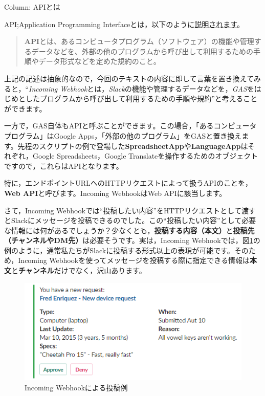 \documentclass[uplatex,a4j]{jsarticle}
\begin{document}
\begin{itembox}[l]{Column: APIとは}

API;Application Programming Interfaceとは，以下のように\href{http://e-words.jp/w/API.html}{説明されます}。

\begin{quote}
\textbf{API}とは、あるコンピュータプログラム（ソフトウェア）の機能や管理するデータなどを、外部の他のプログラムから呼び出して利用するための手順やデータ形式などを定めた規約のこと。
\end{quote}

上記の記述は抽象的なので，今回のテキストの内容に即して言葉を置き換えてみると，``\textit{Incoming Webhook}とは，\textit{Slack}の機能や管理するデータなどを，\textit{GAS}をはじめとしたプログラムから呼び出して利用するための手順や規約''と考えることができます。


一方で，GAS自体もAPIと呼ぶことができます。この場合，「あるコンピュータプログラム」はGoogle Apps，「外部の他のプログラム」をGASと置き換えます。先程のスクリプトの例で登場した\textbf{SpreadsheetApp}や\textbf{LanguageApp}はそれぞれ，Google Spreadsheets，Google Translateを操作するためのオブジェクトですので，これらはAPIとなります。

特に，エンドポイントURLへのHTTPリクエストによって扱うAPIのことを，\textbf{Web API}と呼びます。Incoming WebhookはWeb APIに該当します。

\end{itembox}

さて，Incoming Webhookでは``投稿したい内容''をHTTPリクエストとして渡すとSlackにメッセージを投稿できるのでした。この``投稿したい内容''として必要な情報には何があるでしょうか？少なくとも，\textbf{投稿する内容（本文）}と\textbf{投稿先（チャンネルやDM先）}は必要そうです。実は，Incoming Webhookでは，図\ref{fig:webhook_sample}の例のように，通常私たちがSlackに投稿する形式以上の表現が可能です。そのため，Incoming Webhookを使ってメッセージを投稿する際に指定できる情報は\textbf{本文}と\textbf{チャンネル}だけでなく，沢山あります。

\begin{figure}[h]
 \centering
 \includegraphics[keepaspectratio, scale=0.8]{images/webhook_sample.png}
 \caption{Incoming Webhookによる投稿例}
 \label{fig:webhook_sample}
\end{figure}
\end{document}
